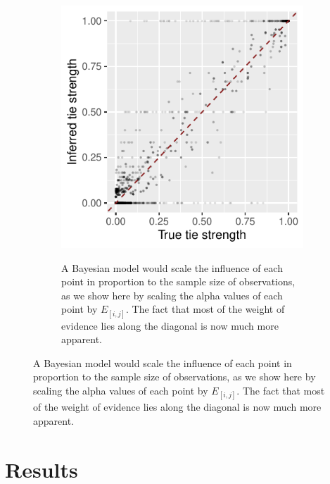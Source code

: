 \documentclass[Afour,sageh,times]{sagej}
\begin{document}
\begin{figure}[h]
  \begin{subfigure}[b]{0.4\textwidth}
         \centering
         \caption{A Bayesian model would scale the influence of each point in proportion to the sample size of observations, as we show here by scaling the alpha values of each point by $E_{[i,j]}$. The fact that most of the weight of evidence lies along the diagonal is now much more apparent.}
         \includegraphics[trim={0 0cm 0 0},clip,width=\textwidth]{Figures/ScatterFrameB.pdf}
         \label{srmx3b_drs}
     \end{subfigure}
\end{figure}

\section{Results}
\end{document}

